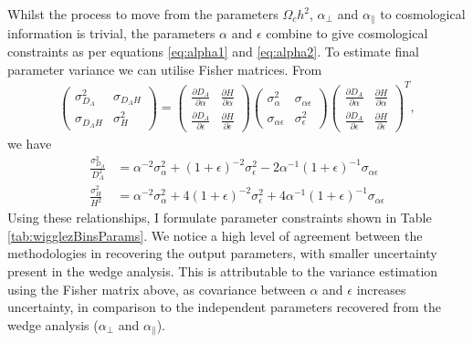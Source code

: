 \documentclass[titlesmallcaps, examinerscopy, copyrightpage]{uqthesis}
\begin{document}
Whilst the process to move from the parameters $\Omega_c h^2$, $\alpha_\perp$ and $\alpha_\parallel$ to cosmological information is trivial, the parameters $\alpha$ and $\epsilon$ combine to give cosmological constraints as per equations \eqref{eq:alpha1} and \eqref{eq:alpha2}. To estimate final parameter variance we can utilise Fisher matrices. From
\begin{align}
\begin{pmatrix}
\sigma_{D_A}^2 & \sigma_{D_A H} \\ \sigma_{D_A H} & \sigma_H^2 \end{pmatrix}
 = 
\begin{pmatrix}
\frac{\partial D_A}{\partial \alpha} & \frac{\partial H}{\partial \alpha} \\ \frac{\partial D_A}{\partial \epsilon} & \frac{\partial H}{\partial \epsilon} \end{pmatrix} 
\begin{pmatrix}
\sigma_\alpha^2 & \sigma_{\alpha \epsilon} \\ \sigma_{\alpha \epsilon} & \sigma_\epsilon^2
\end{pmatrix}
\begin{pmatrix}
\frac{\partial D_A}{\partial \alpha} & \frac{\partial H}{\partial \alpha} \\ \frac{\partial D_A}{\partial \epsilon} & \frac{\partial H}{\partial \epsilon} \end{pmatrix} ^T,
\end{align}
we have
\begin{align}
\frac{\sigma_{D_A}^2}{D_A^2} &= \alpha^{-2} \sigma_\alpha^2 + \left(1 + \epsilon \right)^{-2} \sigma_\epsilon^2 - 2\alpha^{-1}\left(1 + \epsilon \right)^{-1} \sigma_{\alpha \epsilon} \\
\frac{\sigma_H^2}{H^2} &= \alpha^{-2} \sigma_\alpha^2 + 4(1+\epsilon)^{-2} \sigma_\epsilon^2 + 4 \alpha^{-1} (1 + \epsilon)^{-1} \sigma_{\alpha \epsilon}
\end{align}
Using these relationships, I formulate parameter constraints shown in Table \ref{tab:wigglezBinsParams}. We notice a high level of agreement between the methodologies in recovering the output parameters, with smaller uncertainty present in the wedge analysis. This is attributable to the variance estimation using the Fisher matrix above, as covariance between $\alpha$ and $\epsilon$ increases uncertainty, in comparison to the independent parameters recovered from the wedge analysis ($\alpha_\perp$ and $\alpha_\parallel$).
\end{document}
